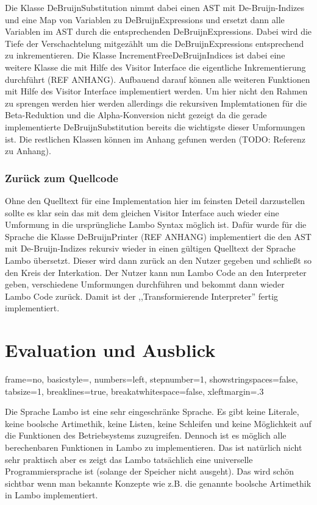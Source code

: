 \documentclass[ngerman]{article}
\begin{document}
Die Klasse DeBruijnSubstitution nimmt dabei einen AST mit De-Bruijn-Indizes und eine Map von Variablen zu DeBruijnExpressions und ersetzt dann alle Variablen im AST durch die entsprechenden DeBruijnExpressions. Dabei wird die Tiefe der Verschachtelung mitgezählt um die DeBruijnExpressions entsprechend zu inkrementieren. Die Klasse IncrementFreeDeBruijnIndices ist dabei eine weitere Klasse die mit Hilfe des Visitor Interface die eigentliche Inkrementierung durchführt (REF ANHANG). Aufbauend darauf können alle weiteren Funktionen mit Hilfe des Visitor Interface implementiert werden. Um hier nicht den Rahmen zu sprengen werden hier werden allerdings die rekursiven Implemtationen für die Beta-Reduktion und die Alpha-Konversion nicht gezeigt da die gerade implementierte DeBruijnSubstitution bereits die wichtigste dieser Umformungen ist. Die restlichen Klassen können im Anhang gefunen werden (TODO: Referenz zu Anhang).

\subsubsection{Zurück zum Quellcode}

Ohne den Quelltext für eine Implementation hier im feinsten Deteil darzustellen sollte es klar sein das mit dem gleichen Visitor Interface auch wieder eine Umformung in die ursprüngliche Lambo Syntax möglich ist. Dafür wurde für die Sprache die Klasse DeBruijnPrinter (REF ANHANG) implementiert die den AST mit De-Bruijn-Indizes rekursiv wieder in einen gültigen Quelltext der Sprache Lambo übersetzt. Dieser wird dann zurück an den Nutzer gegeben und schließt so den Kreis der Interkation. Der Nutzer kann nun Lambo Code an den Interpreter geben, verschiedene Umformungen durchführen und bekommt dann wieder Lambo Code zurück. Damit ist der ,,Transformierende Interpreter'' fertig implementiert.

\section{Evaluation und Ausblick}

\lstset
{
    frame=no,
    basicstyle=\footnotesize,
    numbers=left,
    stepnumber=1,
    showstringspaces=false,
    tabsize=1,
    breaklines=true,
    breakatwhitespace=false,
    xleftmargin=.3\textwidth
}

Die Sprache Lambo ist eine sehr eingeschränke Sprache. Es gibt keine Literale, keine boolsche Artimethik, keine Listen, keine Schleifen und keine Möglichkeit auf die Funktionen des Betriebsystems zuzugreifen. Dennoch ist es möglich alle berechenbaren Funktionen in Lambo zu implementieren. Das ist natürlich nicht sehr praktisch aber es zeigt das Lambo tatsächlich eine universelle Programmiersprache ist (solange der Speicher nicht ausgeht). 
Das wird schön sichtbar wenn man bekannte Konzepte wie z.B. die genannte boolsche Artimethik in Lambo implementiert.
\end{document}
